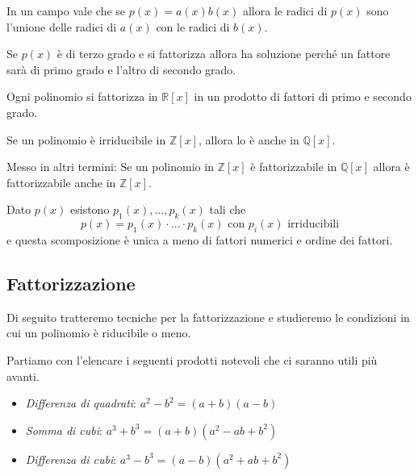 \begin{observation}
	In un campo vale che se $p(x) = a(x)b(x)$ allora le radici di $p(x)$ sono
	l'unione delle radici di $a(x)$ con le radici di $b(x)$.
\end{observation}

\begin{observation}
	Se $p(x)$ \`e di terzo grado e si fattorizza allora ha soluzione perch\'e un fattore sar\`a
	di primo grado e l'altro di secondo grado.
\end{observation}

\begin{proposition}
	Ogni polinomio si fattorizza in $\mathbb{R}[x]$ in un prodotto di fattori di primo e secondo
	grado.
\end{proposition}

\begin{lemma}
	Se un polinomio \`e irriducibile in $\mathbb{Z}[x]$, allora lo \`e anche in
	$\mathbb{Q}[x]$.

	Messo in altri termini: Se un polinomio in $\mathbb{Z}[x]$ \`e fattorizzabile in
	$\mathbb{Q}[x]$ allora \`e fattorizzabile anche in $\mathbb{Z}[x]$.
\end{lemma}

\begin{theorem}
	Dato $p(x)$ esistono $p_1(x), \dots, p_k(x)$ tali che
	\begin{equation*}
		p(x) = p_1(x) \cdot ... \cdot p_k(x) \text{ con $p_i(x)$ irriducibili}
	\end{equation*}
	e questa scomposizione \`e unica a meno di fattori numerici e ordine dei fattori.
\end{theorem}

\subsection{Fattorizzazione}
Di seguito tratteremo tecniche per la fattorizzazione e studieremo le condizioni in cui
un polinomio \`e riducibile o meno.

Partiamo con l'elencare i seguenti prodotti notevoli che ci saranno utili pi\`u avanti.
\begin{itemize}
	\item \emph{Differenza di quadrati}: $a^2 - b^2 = (a + b)(a - b)$
	\item \emph{Somma di cubi}: $a^3 + b^3 = (a + b)(a^2 - ab + b^2)$
	\item \emph{Differenza di cubi}: $a^3 - b^3 = (a - b)(a^2 + ab + b^2)$
\end{itemize}

